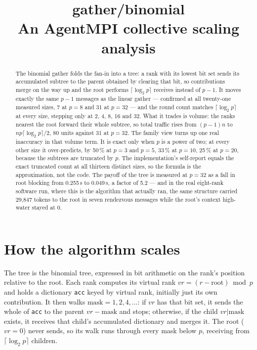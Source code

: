 \documentclass[11pt]{article}
\title{\textbf{gather/binomial}\\[2pt]\large An AgentMPI collective scaling analysis}
\author{}
\date{}
\begin{document}
\maketitle

\begin{abstract}
The binomial gather folds the fan-in into a tree: a rank with its lowest bit set sends its
accumulated subtree to the parent obtained by clearing that bit, so contributions merge on the
way up and the root performs $\lceil\log_2 p\rceil$ receives instead of $p-1$. It moves exactly
the same $p-1$ messages as the linear gather --- confirmed at all twenty-one measured sizes, 7 at
$p=8$ and 31 at $p=32$ --- and the round count matches $\lceil\log_2 p\rceil$ at every size,
stepping only at 2, 4, 8, 16 and 32. What it trades is volume: the ranks nearest the root forward
their whole subtree, so total traffic rises from $(p-1)n$ to $np\lceil\log_2 p\rceil/2$, 80 units
against 31 at $p=32$. The family view turns up one real inaccuracy in that volume term. It is
exact only when $p$ is a power of two; at every other size it over-predicts, by 50\,\% at $p=3$
and $p=5$, 33\,\% at $p=10$, 25\,\% at $p=20$, because the subtrees are truncated by $p$. The
implementation's self-report equals the exact truncated count at all thirteen distinct sizes, so
the formula is the approximation, not the code. The payoff of the tree is measured at $p=32$ as a
fall in root blocking from 0.255\,s to 0.049\,s, a factor of 5.2 --- and in the real
eight-rank software run, where this is the algorithm that actually ran, the same structure carried
29,847 tokens to the root in seven rendezvous messages while the root's context high-water stayed
at 0.
\end{abstract}



\section{How the algorithm scales}

The tree is the binomial tree, expressed in bit arithmetic on the rank's position relative to the
root. Each rank computes its virtual rank $vr = (r - \text{root}) \bmod p$ and holds a dictionary
\texttt{acc} keyed by virtual rank, initially just its own contribution. It then walks
$\text{mask} = 1, 2, 4, \ldots$: if $vr$ has that bit set, it sends the whole of \texttt{acc} to
the parent $vr - \text{mask}$ and stops; otherwise, if the child $vr | \text{mask}$ exists, it
receives that child's accumulated dictionary and merges it. The root ($vr = 0$) never sends, so
its walk runs through every mask below $p$, receiving from $\lceil\log_2 p\rceil$ children.
\end{document}
